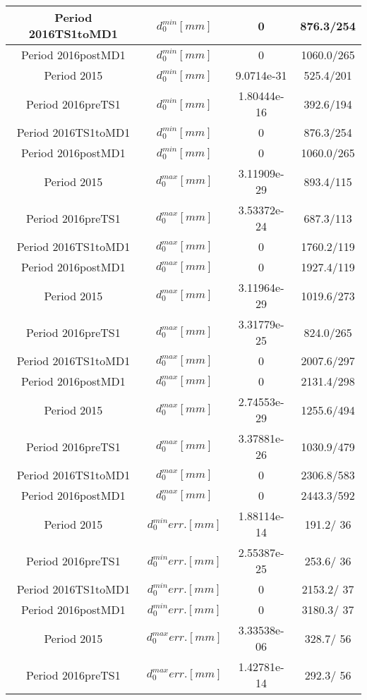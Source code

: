 \documentclass{article}
\begin{document}
\begin{longtable}{c|c|c|c}
\hline
 Period 2016TS1toMD1 & $d_{0}^{min} [mm]$ & 0 & 876.3/254\\
\hline
 Period 2016postMD1 & $d_{0}^{min} [mm]$ & 0 & 1060.0/265\\
\hline
 Period 2015 & $d_{0}^{min} [mm]$ & 9.0714e-31 & 525.4/201\\
\hline
 Period 2016preTS1 & $d_{0}^{min} [mm]$ & 1.80444e-16 & 392.6/194\\
\hline
 Period 2016TS1toMD1 & $d_{0}^{min} [mm]$ & 0 & 876.3/254\\
\hline
 Period 2016postMD1 & $d_{0}^{min} [mm]$ & 0 & 1060.0/265\\
\hline
 Period 2015 & $d_{0}^{max} [mm]$ & 3.11909e-29 & 893.4/115\\
\hline
 Period 2016preTS1 & $d_{0}^{max} [mm]$ & 3.53372e-24 & 687.3/113\\
\hline
 Period 2016TS1toMD1 & $d_{0}^{max} [mm]$ & 0 & 1760.2/119\\
\hline
 Period 2016postMD1 & $d_{0}^{max} [mm]$ & 0 & 1927.4/119\\
\hline
 Period 2015 & $d_{0}^{max} [mm]$ & 3.11964e-29 & 1019.6/273\\
\hline
 Period 2016preTS1 & $d_{0}^{max} [mm]$ & 3.31779e-25 & 824.0/265\\
\hline
 Period 2016TS1toMD1 & $d_{0}^{max} [mm]$ & 0 & 2007.6/297\\
\hline
 Period 2016postMD1 & $d_{0}^{max} [mm]$ & 0 & 2131.4/298\\
\hline
 Period 2015 & $d_{0}^{max} [mm]$ & 2.74553e-29 & 1255.6/494\\
\hline
 Period 2016preTS1 & $d_{0}^{max} [mm]$ & 3.37881e-26 & 1030.9/479\\
\hline
 Period 2016TS1toMD1 & $d_{0}^{max} [mm]$ & 0 & 2306.8/583\\
\hline
 Period 2016postMD1 & $d_{0}^{max} [mm]$ & 0 & 2443.3/592\\
\hline
 Period 2015 & $d_{0}^{min} err. [mm]$ & 1.88114e-14 & 191.2/ 36\\
\hline
 Period 2016preTS1 & $d_{0}^{min} err. [mm]$ & 2.55387e-25 & 253.6/ 36\\
\hline
 Period 2016TS1toMD1 & $d_{0}^{min} err. [mm]$ & 0 & 2153.2/ 37\\
\hline
 Period 2016postMD1 & $d_{0}^{min} err. [mm]$ & 0 & 3180.3/ 37\\
\hline
 Period 2015 & $d_{0}^{max} err. [mm]$ & 3.33538e-06 & 328.7/ 56\\
\hline
 Period 2016preTS1 & $d_{0}^{max} err. [mm]$ & 1.42781e-14 & 292.3/ 56\\

\end{longtable}
\end{document}
